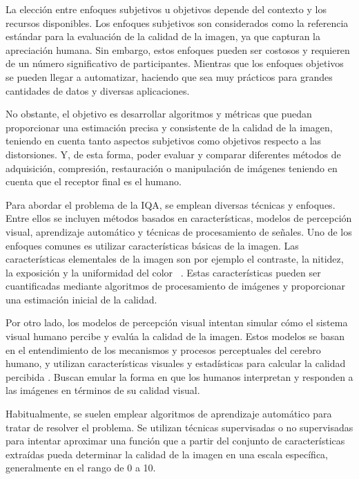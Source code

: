 La elección entre enfoques subjetivos u objetivos depende del contexto y los 
recursos disponibles. Los enfoques subjetivos son considerados como la referencia estándar 
para la evaluación de la calidad de la imagen, ya que capturan la apreciación 
humana. Sin embargo, estos enfoques pueden ser costosos y requieren de un número 
significativo de participantes. 
Mientras que los enfoques objetivos se pueden llegar a automatizar, haciendo que 
sea muy prácticos para grandes cantidades de datos y diversas aplicaciones.
 
No obstante, el objetivo es desarrollar algoritmos y métricas que puedan proporcionar una 
estimación precisa y consistente de la calidad de la imagen, teniendo en cuenta
tanto aspectos subjetivos como objetivos respecto a las distorsiones.
Y, de esta forma, poder evaluar y comparar diferentes métodos de adquisición, compresión, 
restauración o manipulación de imágenes teniendo en cuenta que el receptor 
final es el humano.
 
Para abordar el problema de la IQA, se emplean diversas técnicas y enfoques. 
Entre ellos se incluyen métodos basados en características,
modelos de percepción visual, aprendizaje automático y técnicas de procesamiento de señales.
Uno de los enfoques comunes es utilizar características básicas de la imagen. 
Las características elementales de la imagen son por ejemplo el contraste, 
la nitidez, la exposición y la uniformidad del color~\cite{Wang2006ModernIQ} . 
Estas características pueden ser cuantificadas mediante algoritmos de procesamiento de 
imágenes y proporcionar una estimación inicial de la calidad. 
 
Por otro lado, los modelos de percepción visual intentan simular cómo el sistema 
visual humano percibe y evalúa la calidad de la imagen. Estos modelos se basan 
en el entendimiento de los mecanismos y procesos perceptuales del cerebro humano, 
y utilizan características visuales y estadísticas para calcular la calidad percibida
\cite{MinkowskiFailure, StructuralSimilarityIndex}.
Buscan emular la forma en que los humanos interpretan y responden 
a las imágenes en términos de su calidad visual\cite{IQAbySaliencyMaps, CascadedIQA}.
 
Habitualmente, se suelen emplear algoritmos de aprendizaje automático para tratar
de resolver el problema. Se utilizan técnicas supervisadas o no supervisadas 
para intentar aproximar una función que a partir del conjunto de características 
extraídas pueda determinar la calidad de la imagen en una escala específica, 
generalmente en el rango de 0 a 10.

